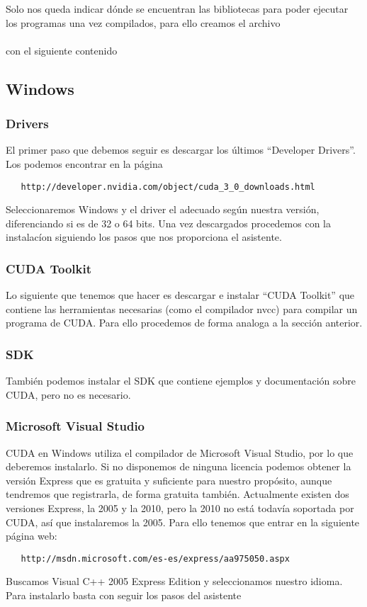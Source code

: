 Solo nos queda indicar dónde se encuentran las bibliotecas para poder ejecutar los programas una vez compilados,
para ello creamos el archivo\\
\\
con el siguiente contenido\\

\subsection{Windows}
\subsubsection{Drivers}
El primer paso que debemos seguir es descargar los últimos ``Developer Drivers''. Los podemos encontrar en la página
  \begin{verbatim}
   http://developer.nvidia.com/object/cuda_3_0_downloads.html
  \end{verbatim}
Seleccionaremos Windows y el driver el adecuado según nuestra
versión, diferenciando si es de 32 o 64 bits. Una vez descargados procedemos con la instalacíon siguiendo
los pasos que nos proporciona el asistente.
\subsubsection{CUDA Toolkit}
Lo siguiente que tenemos que hacer es descargar e instalar ``CUDA Toolkit'' que contiene las herramientas necesarias
(como el compilador nvcc) para compilar un programa de CUDA. Para ello procedemos de forma analoga a la sección anterior.
\subsubsection{SDK}
También podemos instalar el SDK que contiene ejemplos y documentación sobre CUDA, pero no es necesario.
\subsubsection{Microsoft Visual Studio}
CUDA en Windows utiliza el compilador  de Microsoft Visual Studio, por lo que deberemos instalarlo.
Si no disponemos de ninguna licencia podemos obtener la versión Express que es gratuita y suficiente para nuestro propósito,
aunque tendremos que registrarla, de forma gratuita también. Actualmente existen dos versiones Express, la 2005 y la 2010,
pero la 2010 no está todavía soportada por CUDA, así que instalaremos la 2005. Para ello tenemos que entrar en la
siguiente página web:
  \begin{verbatim}
   http://msdn.microsoft.com/es-es/express/aa975050.aspx
  \end{verbatim}
Buscamos Visual C++ 2005 Express Edition y seleccionamos nuestro idioma. Para instalarlo basta con seguir los pasos
del asistente
